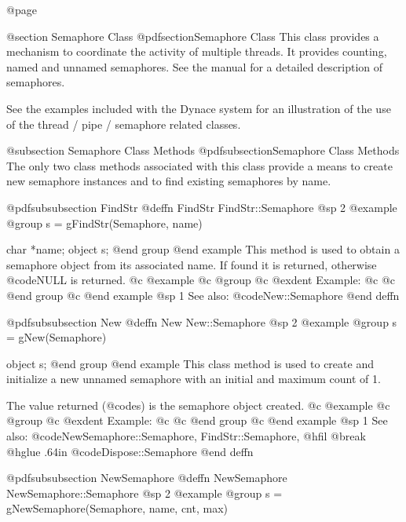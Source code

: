 @page

@section Semaphore Class
@pdfsection{Semaphore Class}
This class provides a mechanism to coordinate the activity of multiple
threads.  It provides counting, named and unnamed semaphores.
 See the manual for a detailed description of semaphores.


See the examples included with the Dynace system for an illustration of the
use of the thread / pipe / semaphore related classes.


@subsection Semaphore Class Methods
@pdfsubsection{Semaphore Class Methods}
The only two class methods associated with this class provide a
means to create new semaphore instances and to find existing
semaphores by name.








@pdfsubsubsection {FindStr}
@deffn {FindStr} FindStr::Semaphore
@sp 2
@example
@group
s = gFindStr(Semaphore, name)

char    *name;
object  s;
@end group
@end example
This method is used to obtain a semaphore object from its associated name.
If found it is returned, otherwise @code{NULL} is returned.  
@c @example
@c @group
@c @exdent Example:
@c 
@c @end group
@c @end example
@sp 1
See also:  @code{New::Semaphore}
@end deffn










@pdfsubsubsection {New}
@deffn {New} New::Semaphore
@sp 2
@example
@group
s = gNew(Semaphore)

object  s;
@end group
@end example
This class method is used to create and initialize a new unnamed semaphore
with an initial and maximum count of 1.

The value returned (@code{s}) is the semaphore object created.
@c @example
@c @group
@c @exdent Example:
@c 
@c @end group
@c @end example
@sp 1
See also:  @code{NewSemaphore::Semaphore, FindStr::Semaphore,}
@hfil @break @hglue .64in      @code{Dispose::Semaphore}
@end deffn













@pdfsubsubsection {NewSemaphore}
@deffn {NewSemaphore} NewSemaphore::Semaphore
@sp 2
@example
@group
s = gNewSemaphore(Semaphore, name, cnt, max)

